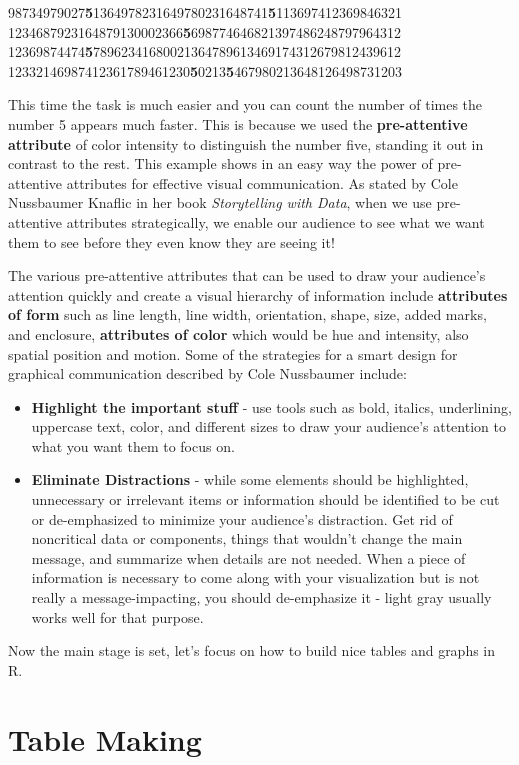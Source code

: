 \documentclass[
]{krantz}
\providecommand{\tightlist}{%
  \setlength{\itemsep}{0pt}\setlength{\parskip}{0pt}}
\begin{document}
98734979027\textbf{5}1364978231649780231648741\textbf{5}113697412369846321
1234687923164879130002366\textbf{5}698774646821397486248797964312
12369874474\textbf{5}78962341680021364789613469174312679812439612
12332146987412361789461230\textbf{5}0213\textbf{5}467980213648126498731203

This time the task is much easier and you can count the number of times the number 5 appears much faster. This is because we used the \textbf{pre-attentive attribute} of color intensity to distinguish the number five, standing it out in contrast to the rest. This example shows in an easy way the power of pre-attentive attributes for effective visual communication. As stated by Cole Nussbaumer Knaflic in her book \emph{Storytelling with Data}, when we use pre-attentive attributes strategically, we enable our audience to see what we want them to see before they even know they are seeing it!

The various pre-attentive attributes that can be used to draw your audience's attention quickly and create a visual hierarchy of information include \textbf{attributes of form} such as line length, line width, orientation, shape, size, added marks, and enclosure, \textbf{attributes of color} which would be hue and intensity, also spatial position and motion. Some of the strategies for a smart design for graphical communication described by Cole Nussbaumer include:

\begin{itemize}
\tightlist
\item
  \textbf{Highlight the important stuff} - use tools such as bold, italics, underlining, uppercase text, color, and different sizes to draw your audience's attention to what you want them to focus on.
\item
  \textbf{Eliminate Distractions} - while some elements should be highlighted, unnecessary or irrelevant items or information should be identified to be cut or de-emphasized to minimize your audience's distraction. Get rid of noncritical data or components, things that wouldn't change the main message, and summarize when details are not needed. When a piece of information is necessary to come along with your visualization but is not really a message-impacting, you should de-emphasize it - light gray usually works well for that purpose.
\end{itemize}

Now the main stage is set, let's focus on how to build nice tables and graphs in R.

\hypertarget{table_making}{%
\section{Table Making}\label{table_making}}
\end{document}
